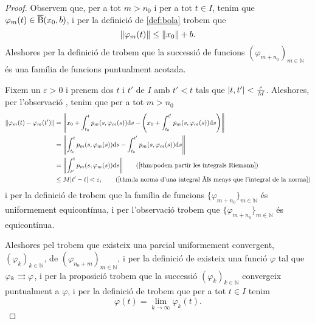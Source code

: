 \documentclass[../Apunts.tex]{subfiles}
\begin{document}
\begin{theorem}
\begin{proof}
			Observem que, per a tot \(m>n_{0}\) i per a tot \(t\in I\), tenim que \(\varphi_{m}(t)\in\overline{\operatorname{B}}(x_{0},b)\), i per la definició de \ref{def:bola} trobem que
			\[\norm{\varphi_{m}(t)}\leq\norm{x_{0}}+b.\]
			Aleshores per la definició de  trobem que la successió de funcions \((\varphi_{m+n_{0}})_{m\in\mathbb{N}}\) és una família de funcions puntualment acotada.
			
			Fixem un \(\varepsilon>0\) i prenem dos \(t\) i \(t'\) de \(I\) amb \(t'<t\) tals que \(\abs{t,t'}<\frac{\varepsilon}{M}\). Aleshores, per l'observació , tenim que per a tot \(m>n_{0}\)
			\begin{align*}
				\norm{\varphi_{m}(t)-\varphi_{m}(t')}&=\norm{x_{0}+\int_{t_{0}}^{t}p_{m}(s,\varphi_{m}(s))\diff s-\Bigg(x_{0}+\int_{t_{0}}^{t'}p_{m}(s,\varphi_{m}(s))\diff s\Bigg)} \\
				&=\norm{\int_{t_{0}}^{t}p_{m}(s,\varphi_{m}(s))\diff s-\int_{t_{0}}^{t'}p_{m}(s,\varphi_{m}(s))\diff s} \\
				&=\norm{\int_{t'}^{t}p_{m}(s,\varphi_{m}(s))\diff s} \tag{\ref{thm:podem partir les integrals Riemann}} \\
				&\leq M\abs{t'-t}<\varepsilon, \tag{\ref{thm:la norma d'una integral és menys que l'integral de la norma}}
			\end{align*}
			i per la definició de  trobem que la família de funcions \(\{\varphi_{m+n_{0}}\}_{m\in\mathbb{N}}\) és uniformement equicontínua, i per l'observació  trobem que \(\{\varphi_{m+n_{0}}\}_{m\in\mathbb{N}}\) és equicontínua.
			
			Aleshores pel  trobem que existeix una parcial uniformement convergent, \((\varphi_{k})_{k\in\mathbb{N}}\), de \((\varphi_{n_{0}+m})_{m\in\mathbb{N}}\), i per la definició de  existeix una funció \(\varphi\) tal que \(\varphi_{k}\rightrightarrows\varphi\), i per la proposició  trobem que la successió \((\varphi_{k})_{k\in\mathbb{N}}\) convergeix puntualment a \(\varphi\), i per la definició de  trobem que per a tot \(t\in I\) tenim
			\begin{equation}
				\label{thm:Teorema de Peano:eq1}
				\varphi(t)=\lim_{k\to\infty}\varphi_{k}(t).
			\end{equation}
			

\end{proof}
\end{theorem}
\end{document}
